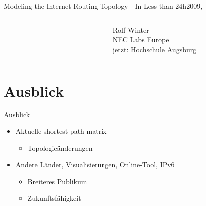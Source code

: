 \documentclass[ngerman,compress,hyperref={bookmarks}]{beamer}
\begin{document}
\begin{frame}{Modeling the Internet Routing Topology - In Less than 24h}{2009, \cite{Winter:2009:MIR:1577959.1577976}}
\begin{columns}[c]
\begin{column}{0.09\textwidth}
\begin{figure}
      \end{figure}
    \end{column}
    \begin{column}{0.3\textwidth}
      {\scriptsize Rolf Winter\\
      \vspace{0.2cm}
      NEC Labs Europe\\jetzt: Hochschule Augsburg\\}
    \end{column}
  \end{columns}
\end{frame}

\section{Ausblick}
\begin{frame}{Ausblick}
\begin{itemize}
 \item Aktuelle shortest path matrix
 \begin{itemize}
  \item Topologieänderungen
 \end{itemize}\vspace{1cm}
 \item Andere Länder, Visualisierungen, Online-Tool, IPv6
 \begin{itemize}
  \item Breiteres Publikum
  \item Zukunftsfähigkeit
 \end{itemize}
\end{itemize}
\end{frame}
\end{document}
